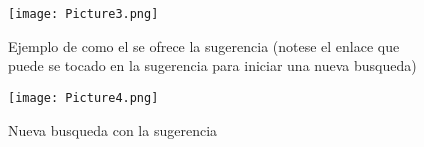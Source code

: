 \documentclass[a4paper,12pt]{article}
\begin{document}
\begin{figure}[h]
    \center
    \texttt{[image: Picture3.png]}
    \caption{Ejemplo de como el se ofrece la sugerencia (notese el enlace que puede se tocado en la sugerencia para iniciar una nueva busqueda)}
    \label{fig:logo}
\end{figure}

\begin{figure}[h]
    \center
    \texttt{[image: Picture4.png]}
    \caption{Nueva busqueda con la sugerencia}
\end{figure}



\tableofcontents
\end{document}
